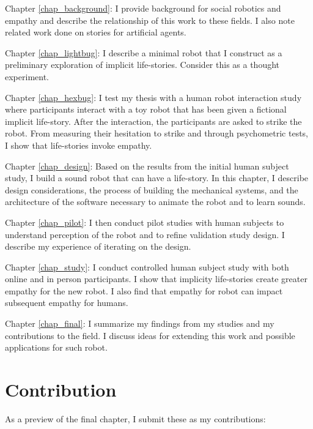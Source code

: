\hspace{7pt} Chapter \ref{chap_background}: I provide background for social robotics and empathy and describe the relationship of this work to these fields. I also note related work done on stories for artificial agents.

Chapter \ref{chap_lightbug}: I describe a minimal robot that I construct as a preliminary exploration
of implicit life-stories. Consider this as a thought experiment. 

Chapter \ref{chap_hexbug}: I test my thesis with a human robot interaction study where participants interact with a toy robot that has been given a fictional implicit life-story. After the interaction, the participants are asked to strike the robot. From measuring their hesitation to strike and through psychometric tests, I show that life-stories invoke empathy.

Chapter \ref{chap_design}: Based on the results from the initial human subject study, I build a sound robot that can have a life-story. In this chapter, I describe design considerations, the process of building the mechanical systems, and the architecture of the software necessary to animate the robot and to learn sounds. 

Chapter \ref{chap_pilot}: I then conduct pilot studies with human subjects to understand perception of the robot and to refine validation study design. I describe my experience of iterating on the design. 


Chapter \ref{chap_study}: I conduct controlled human subject study with both online and in person participants. I show that implicity life-stories create greater empathy for the new robot. I also find that empathy for robot can impact subsequent empathy for humans. 

Chapter \ref{chap_final}: I summarize my findings from my studies and my contributions to the field. I discuss ideas for extending this work and possible applications for such robot.



\section{Contribution}
As a preview of the final chapter, I submit these as my contributions:


